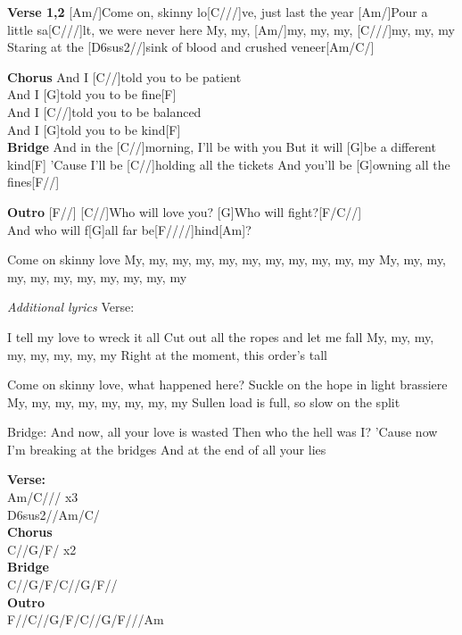 \documentclass{article}
\begin{document}
\begin{guitar}
\begin{multicols}{2}

\textbf{Verse 1,2}
[Am/]Come on, skinny lo[C///]ve, just last the year
[Am/]Pour a little sa[C///]lt, we were never here
My, my, [Am/]my, my, my, [C///]my,  my, my
Staring at the [D6sus2//]sink of blood and crushed veneer[Am/C/]

\textbf{Chorus}
And I [C//]told you to be patient\\
And I [G]told you to be fine[F]\\
And I [C//]told you to be balanced\\
And I [G]told you to be kind[F]\\

\textbf{Bridge}
And in the [C//]morning, I'll be with you
But it will [G]be a different kind[F]
'Cause I'll be [C//]holding all the tickets
And you'll be [G]owning all the fines[F//] 

\textbf{Outro}
[F//]
[C//]Who will love you?
[G]Who will fight?[F/C//]\\
And who will f[G]all 
far be[F////]hind[Am]?

Come on skinny love
My, my, my, my, my, my, my, my, my, my, my
My, my, my, my, my, my, my, my, my, my, my
\end{multicols}

\begin{center}
\textit{Additional lyrics}
Verse:

I tell my love to wreck it all
Cut out all the ropes and let me fall
My, my, my, my, my, my, my, my
Right at the moment, this order's tall

Come on skinny love, what happened here?
Suckle on the hope in light brassiere
My, my, my, my, my, my, my, my
Sullen load is full, so slow on the split

Bridge:
And now, all your love is wasted
Then who the hell was I?
'Cause now I'm breaking at the bridges
And at the end of all your lies


\end{center}
\end{guitar}

\textbf{Verse:}\\
Am/C/// x3\\
D6sus2//Am/C/\\
\textbf{Chorus}\\
C//G/F/ x2\\
\textbf{Bridge}\\
C//G/F/C//G/F//\\
\textbf{Outro}\\
F//C//G/F/C//G/F///Am
\end{document}
